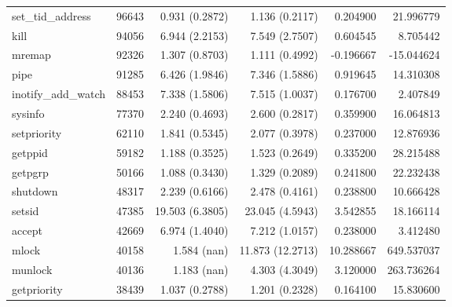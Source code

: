 \begin{longtable}{>{\ttfamily}lrrrrr}
              set\_tid\_address &       96643 &           0.931 (0.2872) &           1.136 (0.2117) &        0.204900 &    21.996779 \\
                           kill &       94056 &           6.944 (2.2153) &           7.549 (2.7507) &        0.604545 &     8.705442 \\
                         mremap &       92326 &           1.307 (0.8703) &           1.111 (0.4992) &       -0.196667 &   -15.044624 \\
                           pipe &       91285 &           6.426 (1.9846) &           7.346 (1.5886) &        0.919645 &    14.310308 \\
            inotify\_add\_watch &       88453 &           7.338 (1.5806) &           7.515 (1.0037) &        0.176700 &     2.407849 \\
                        sysinfo &       77370 &           2.240 (0.4693) &           2.600 (0.2817) &        0.359900 &    16.064813 \\
                    setpriority &       62110 &           1.841 (0.5345) &           2.077 (0.3978) &        0.237000 &    12.876936 \\
                        getppid &       59182 &           1.188 (0.3525) &           1.523 (0.2649) &        0.335200 &    28.215488 \\
                        getpgrp &       50166 &           1.088 (0.3430) &           1.329 (0.2089) &        0.241800 &    22.232438 \\
                       shutdown &       48317 &           2.239 (0.6166) &           2.478 (0.4161) &        0.238800 &    10.666428 \\
                         setsid &       47385 &          19.503 (6.3805) &          23.045 (4.5943) &        3.542855 &    18.166114 \\
                         accept &       42669 &           6.974 (1.4040) &           7.212 (1.0157) &        0.238000 &     3.412480 \\
                          mlock &       40158 &              1.584 (nan) &         11.873 (12.2713) &       10.288667 &   649.537037 \\
                        munlock &       40136 &              1.183 (nan) &           4.303 (4.3049) &        3.120000 &   263.736264 \\
                    getpriority &       38439 &           1.037 (0.2788) &           1.201 (0.2328) &        0.164100 &    15.830600 \\

\end{longtable}
